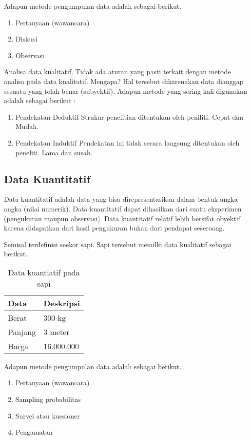 Adapun metode pengumpulan data adalah sebagai berikut.
\begin{enumerate}
	\item Pertanyaan (wawancara)
	\item Diskusi
	\item Observasi
\end{enumerate}

Analisa data kualitatif.
Tidak ada aturan yang pasti terkait dengan metode analisa pada data kualitatif. Mengapa? Hal tersebut dikarenakan data dianggap sesuatu yang telah benar (subyektif). Adapun metode yang sering kali digunakan adalah sebagai berikut :
\begin{enumerate}
	\item Pendekatan Deduktif 
	Strukur penelitian ditentukan oleh peniliti. Cepat dan Mudah.
	\item Pendekatan Induktif
	Pendekatan ini tidak secara langsung ditentukan oleh peneliti. Lama dan susah.
\end{enumerate}

\subsection{Data Kuantitatif}
Data kuantitatif adalah data yang bisa direpresentasikan dalam bentuk angka-angka (nilai numerik). Data kuantitatif dapat dihasilkan dari suatu eksperimen (pengukuran maupun observasi). Data kuantitatif relatif lebih bersifat obyektif karena didapatkan dari hasil pengukuran bukan dari pendapat seseroang. 

Semisal terdefinisi seekor sapi. Sapi tersebut memilki data kualitatif sebagai berikut.
\begin{table}[hbt!]
  \centering
   \caption{Data kuantiatif pada sapi}
   \label{tab:1-1}
  \begin{tabular}{ p{3cm} p{7cm} }
    \hline\hline
    Data & Deskripsi\\
    \hline
    Berat & 300 kg \\
    Panjang & 3 meter \\
    Harga & 16.000.000 \\
    \hline 
  \end{tabular}
\end{table}

Adapun metode pengumpulan data adalah sebagai berikut.
\begin{enumerate}
	\item Pertanyaan (wawancara)
	\item Sampling probabilitas
	\item Survei atau kuesioner
	\item Pengamatan
\end{enumerate}

